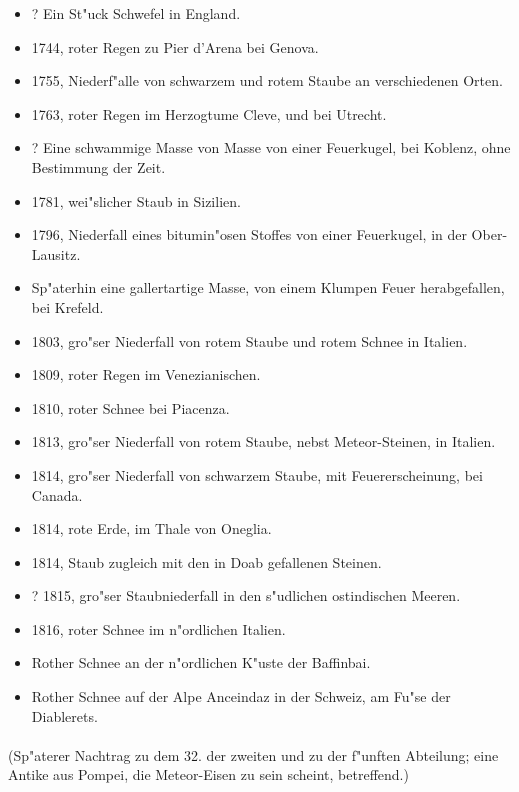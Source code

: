 \documentclass[a4paper, 11pt, oneside, polutonikogreek, german]{article}
\begin{document}
\begin{itemize}
    \item ? Ein St"uck Schwefel in England.
    \item 1744, roter Regen zu Pier d'Arena bei Genova.
    \item 1755, Niederf"alle von schwarzem und rotem Staube an verschiedenen Orten.
    \item 1763, roter Regen im Herzogtume Cleve, und bei Utrecht.
    \item ? Eine schwammige Masse von Masse von einer Feuerkugel, bei Koblenz, ohne Bestimmung der Zeit.
    \item 1781, wei"slicher Staub in Sizilien.
    \item 1796, Niederfall eines bitumin"osen Stoffes von einer Feuerkugel, in der Ober-Lausitz.
    \item Sp"aterhin eine gallertartige Masse, von einem Klumpen Feuer herabgefallen, bei Krefeld.
    \item 1803, gro"ser Niederfall von rotem Staube und rotem Schnee in Italien.
    \item 1809, roter Regen im Venezianischen.
    \item 1810, roter Schnee bei Piacenza.
    \item 1813, gro"ser Niederfall von rotem Staube, nebst Meteor-Steinen, in Italien.
    \item 1814, gro"ser Niederfall von schwarzem Staube, mit Feuererscheinung, bei Canada.
    \item 1814, rote Erde, im Thale von Oneglia.
    \item 1814, Staub zugleich mit den in Doab gefallenen Steinen.
    \item ? 1815, gro"ser Staubniederfall in den s"udlichen ostindischen Meeren.
    \item 1816, roter Schnee im n"ordlichen Italien.
    \item Rother Schnee an der n"ordlichen K"uste der Baffinbai.
    \item Rother Schnee auf der Alpe Anceindaz in der Schweiz, am Fu"se der Diablerets.
\end{itemize}
\paragraph{}
(Sp"aterer Nachtrag zu dem 32. der zweiten und zu der f"unften Abteilung; eine Antike aus Pompei, die Meteor-Eisen zu sein scheint, betreffend.)
\subsection*{}
\end{document}
